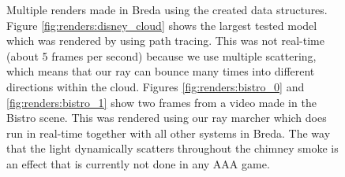 \begin{figure}[H]
    \centering
    \hfill
    \hfill

    \hfill

    \caption{Multiple renders made in Breda using the created data structures. Figure \ref{fig:renders:disney_cloud} shows the largest tested model which was rendered by using path tracing. This was not real-time (about 5 frames per second) because we use multiple scattering, which means that our ray can bounce many times into different directions within the cloud. Figures \ref{fig:renders:bistro_0} and \ref{fig:renders:bistro_1} show two frames from a video made in the Bistro scene. This was rendered using our ray marcher which does run in real-time together with all other systems in Breda. The way that the light dynamically scatters throughout the chimney smoke is an effect that is currently not done in any AAA game.} \label{fig:renders}
\end{figure}